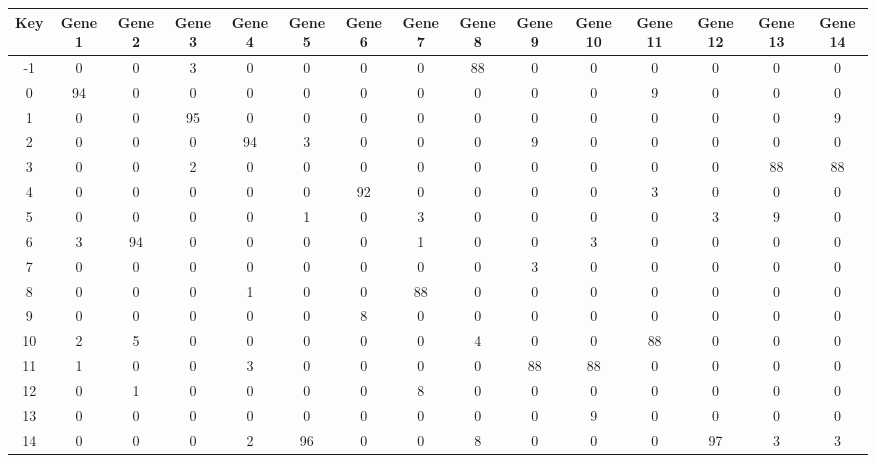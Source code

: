 \begin{tabular}{|c|c|c|c|c|c|c|c|c|c|c|c|c|c|c|}
\hline
Key & Gene 1 & Gene 2 & Gene 3 & Gene 4 & Gene 5 & Gene 6 & Gene 7 & Gene 8 & Gene 9 & Gene 10 & Gene 11 & Gene 12 & Gene 13 & Gene 14 \\
\hline
-1 & 0 & 0 & 3 & 0 & 0 & 0 & 0 & 88 & 0 & 0 & 0 & 0 & 0 & 0 \\
0 & 94 & 0 & 0 & 0 & 0 & 0 & 0 & 0 & 0 & 0 & 9 & 0 & 0 & 0 \\
1 & 0 & 0 & 95 & 0 & 0 & 0 & 0 & 0 & 0 & 0 & 0 & 0 & 0 & 9 \\
2 & 0 & 0 & 0 & 94 & 3 & 0 & 0 & 0 & 9 & 0 & 0 & 0 & 0 & 0 \\
3 & 0 & 0 & 2 & 0 & 0 & 0 & 0 & 0 & 0 & 0 & 0 & 0 & 88 & 88 \\
4 & 0 & 0 & 0 & 0 & 0 & 92 & 0 & 0 & 0 & 0 & 3 & 0 & 0 & 0 \\
5 & 0 & 0 & 0 & 0 & 1 & 0 & 3 & 0 & 0 & 0 & 0 & 3 & 9 & 0 \\
6 & 3 & 94 & 0 & 0 & 0 & 0 & 1 & 0 & 0 & 3 & 0 & 0 & 0 & 0 \\
7 & 0 & 0 & 0 & 0 & 0 & 0 & 0 & 0 & 3 & 0 & 0 & 0 & 0 & 0 \\
8 & 0 & 0 & 0 & 1 & 0 & 0 & 88 & 0 & 0 & 0 & 0 & 0 & 0 & 0 \\
9 & 0 & 0 & 0 & 0 & 0 & 8 & 0 & 0 & 0 & 0 & 0 & 0 & 0 & 0 \\
10 & 2 & 5 & 0 & 0 & 0 & 0 & 0 & 4 & 0 & 0 & 88 & 0 & 0 & 0 \\
11 & 1 & 0 & 0 & 3 & 0 & 0 & 0 & 0 & 88 & 88 & 0 & 0 & 0 & 0 \\
12 & 0 & 1 & 0 & 0 & 0 & 0 & 8 & 0 & 0 & 0 & 0 & 0 & 0 & 0 \\
13 & 0 & 0 & 0 & 0 & 0 & 0 & 0 & 0 & 0 & 9 & 0 & 0 & 0 & 0 \\
14 & 0 & 0 & 0 & 2 & 96 & 0 & 0 & 8 & 0 & 0 & 0 & 97 & 3 & 3 \\
\hline
\end{tabular}